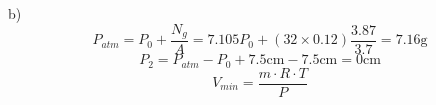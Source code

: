 b) \\
\[
P_{atm} = P_0 + \frac{N_g}{A} = 7.105P_0 + \left(32 \times 0.12 \right) \frac{3.87}{3.7} = 7.16 \text{g}
\]
\[
P_2 = P_{atm} - P_0 + 7.5 \text{cm} - 7.5 \text{cm} = 0 \text{cm}
\]
\[
V_{min} = \frac{m \cdot R \cdot T}{P}
\]